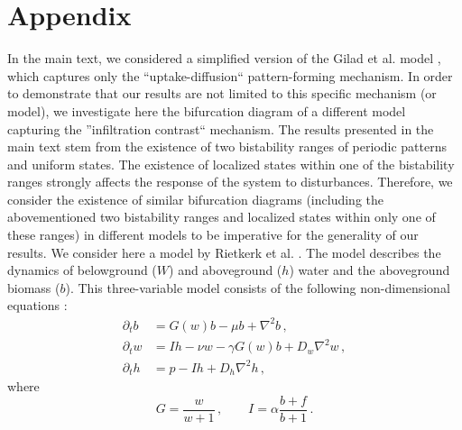 \documentclass[aps,prl,preprint,superscriptaddress,floatfix]{revtex4-1}
\begin{document}

\setcounter{equation}{0}
\appendix*
\section{Appendix}
In the main text, we considered a simplified version of the Gilad et al. model \cite{Gilad2004prl,Gilad2007jtb,zelnik2013regime}, which captures only the ``uptake-diffusion`` pattern-forming mechanism. In order to demonstrate that our results are not limited to this specific mechanism (or model), we investigate here the bifurcation diagram of a different model capturing the ''infiltration contrast`` mechanism. 
The results presented in the main text stem from the existence of two bistability ranges of periodic patterns and uniform states. 
The existence of localized states within one of the bistability ranges strongly affects the response of the system to disturbances.
Therefore, we consider the existence of similar bifurcation diagrams (including the abovementioned two bistability ranges and localized states within only one of these ranges) in different models to be imperative for the generality of our results. 
We consider here a model by Rietkerk et al. \cite{Rietkerk2002an, HilleRisLambers2001ecology}. The model describes the dynamics of belowground ($W$) and aboveground ($h$) water and the aboveground biomass ($b$). 
This three-variable model consists of the following non-dimensional equations \cite{zelnik2013regime}:
\begin{align}
 \partial_t b&=G(w) b-\mu b+\nabla^2b\,, \label{Rb} \\
 \partial_t w&= Ih - \nu w -\gamma G(w) b +D_w\nabla^2 w\,, \label{Rw} \\
 \partial_t h&=p- Ih +D_h\nabla^2h\,, \label{Rh}
\end{align}
where
\begin{equation}
    G=\frac{w}{w+1}\,,\qquad I=\alpha\frac{b+f}{b+1}\,.\label{GI}
\end{equation}
\end{document}
